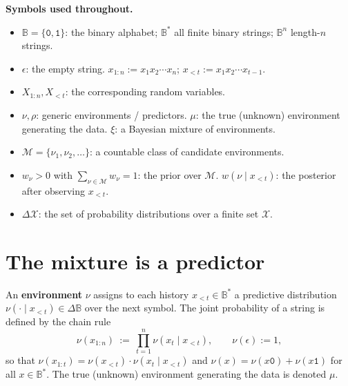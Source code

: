 \documentclass[fontsize=11pt, parskip=half]{scrartcl}
\newcommand{\Mc}{\mathcal{M}}
\begin{document}
\begin{callout}[note]
\textbf{Symbols used throughout.}
\begin{itemize}\itemsep=2pt
  \item $\mathbb{B} = \{\texttt{0}, \texttt{1}\}$: the binary alphabet; $\mathbb{B}^*$ all finite binary strings; $\mathbb{B}^n$ length-$n$ strings.
  \item $\epsilon$: the empty string. $x_{1:n} := x_1 x_2 \cdots x_n$; $x_{<t} := x_1 x_2 \cdots x_{t-1}$.
  \item $X_{1:n}, X_{<t}$: the corresponding random variables.
  \item $\nu, \rho$: generic environments / predictors. $\mu$: the true (unknown) environment generating the data. $\xi$: a Bayesian mixture of environments.
  \item $\Mc = \{\nu_1, \nu_2, \ldots\}$: a countable class of candidate environments.
  \item $w_\nu > 0$ with $\sum_{\nu \in \Mc} w_\nu = 1$: the prior over $\Mc$. $w(\nu \mid x_{<t})$: the posterior after observing $x_{<t}$.
  \item $\Delta \mathcal{X}$: the set of probability distributions over a finite set $\mathcal{X}$.
\end{itemize}
\end{callout}

\section{The mixture is a predictor}\label{prob:one_step}

\begin{definition}[Environment]\label{def:environment}
An \textbf{environment} $\nu$ assigns to each history $x_{<t} \in \mathbb{B}^*$ a predictive distribution $\nu(\cdot \mid x_{<t}) \in \Delta \mathbb{B}$ over the next symbol. The joint probability of a string is defined by the chain rule
\[
\nu(x_{1:n}) ~:=~ \prod_{t=1}^{n} \nu(x_t \mid x_{<t}), \qquad \nu(\epsilon) := 1,
\]
so that $\nu(x_{1:t}) = \nu(x_{<t}) \cdot \nu(x_t \mid x_{<t})$ and $\nu(x) = \nu(x\texttt{0}) + \nu(x\texttt{1})$ for all $x \in \mathbb{B}^*$. The true (unknown) environment generating the data is denoted $\mu$.
\end{definition}
\end{document}
